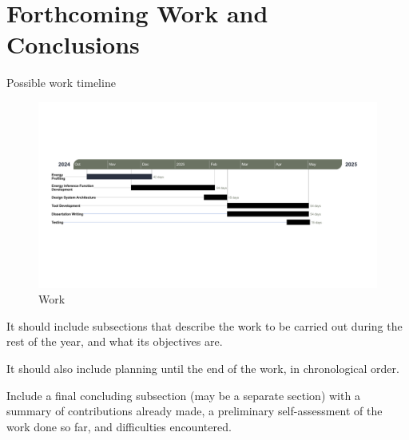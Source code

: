 \documentclass[sigplan]{acmart}
\begin{document}
\section{Forthcoming Work and Conclusions} \label{sec:conclusions}

Possible work timeline

\begin{figure}[h]
  \centering
  \includegraphics[width = 0.5 \textwidth]{figures/gantt_diagram.png}
  \caption{Work}
  \label{fig:gantt_diagram}
\end{figure}


It should include subsections that describe the work to be carried out during the rest of the year, and what its objectives are.

It should also include planning until the end of the work, in chronological order.

Include a final concluding subsection (may be a separate section) with a summary of contributions already made, a preliminary self-assessment of the work done so far, and difficulties encountered.




\end{document}
